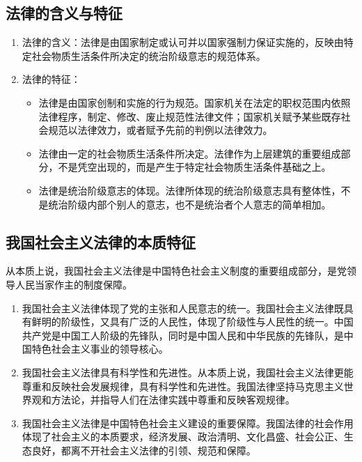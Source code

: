 \subsection{法律的含义与特征}
\begin{enumerate}
\item 法律的含义：法律是由国家制定或认可并以国家强制力保证实施的，反映由特定社会物质生活条件所决定的统治阶级意志的规范体系。
\item 法律的特征：
\begin{itemize}
\item 法律是由国家创制和实施的行为规范。国家机关在法定的职权范围内依照法律程序，制定、修改、废止规范性法律文件；国家机关赋予某些既存社会规范以法律效力，或者赋予先前的判例以法律效力。
\item 法律由一定的社会物质生活条件所决定。法律作为上层建筑的重要组成部分，不是凭空出现的，而是产生于特定社会物质生活条件基础之上。
\item 法律是统治阶级意志的体现。法律所体现的统治阶级意志具有整体性，不是统治阶级内部个别人的意志，也不是统治者个人意志的简单相加。
\end{itemize}
\end{enumerate}

\subsection{我国社会主义法律的本质特征}
从本质上说，我国社会主义法律是中国特色社会主义制度的重要组成部分，是党领导人民当家作主的制度保障。
\begin{enumerate}
\item 我国社会主义法律体现了党的主张和人民意志的统一。我国社会主义法律既具有鲜明的阶级性，又具有广泛的人民性，体现了阶级性与人民性的统一。中国共产党是中国工人阶级的先锋队，同时是中国人民和中华民族的先锋队，是中国特色社会主义事业的领导核心。
\item 我国社会主义法律具有科学性和先进性。从本质上说，我国社会主义法律更能尊重和反映社会发展规律，具有科学性和先进性。我国法律坚持马克思主义世界观和方法论，并指导人们在法律实践中尊重和反映客观规律。
\item 我国社会主义法律是中国特色社会主义建设的重要保障。我国法律的社会作用体现了社会主义的本质要求，经济发展、政治清明、文化昌盛、社会公正、生态良好，都离不开社会主义法律的引领、规范和保障。
\end{enumerate}

